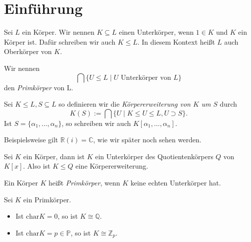 \section{Einführung}

\begin{definition}
    Sei $L$ ein Körper. Wir nennen $K \subseteq L$ einen Unterkörper, wenn $1 \in K$ und $K$ ein Körper ist. Dafür schreiben wir auch $K \leq L$. In diesem Kontext heißt $L$ auch Oberkörper von $K$.

    Wir nennen
    $$ \bigcap \{ U \leq L \mid U \text{ Unterkörper von } L \} $$
    den \emph{Primkörper} von L.

    Sei $K \leq L, S \subseteq L$ so definieren wir die \emph{Körpererweiterung von $K$ um $S$} durch
    $$ K(S) := \bigcap \{ U \mid K \leq U \leq L, U \supset S \}. $$
    Ist $S = \{ \alpha_1, \hdots, \alpha_n \}$, so schreiben wir auch $K[\alpha_1, \hdots, \alpha_n]$.
\end{definition}

\begin{remark}
    Beispielsweise gilt $\mathbb{R}(i) = \mathbb{C}$, wie wir später noch sehen werden.
\end{remark}

\begin{remark}
    Sei $K$ ein Körper, dann ist $K$ ein Unterkörper des Quotientenkörpers $Q$ von $K[x]$. Also ist $K \leq Q$ eine Körpererweiterung.
\end{remark}

\begin{definition}
    Ein Körper $K$ heißt \emph{Primkörper}, wenn $K$ keine echten Unterkörper hat.
\end{definition}

\begin{theorem}
    Sei $K$ ein Primkörper.
    \begin{itemize}
        \item Ist $\mathrm{char} K = 0$, so ist $K \cong \mathbb{Q}$.
        \item Ist $\mathrm{char} K = p \in \mathbb{P}$, so ist $K \cong \mathbb{Z}_p$.
    \end{itemize}
\end{theorem}